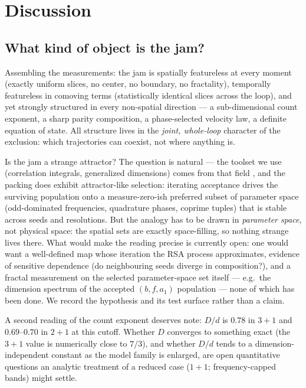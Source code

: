 \documentclass[11pt]{article}
\begin{document}
\section{Discussion}
\label{sec:disc}

\subsection{What kind of object is the jam?}

Assembling the measurements: the jam is spatially featureless at every
moment (exactly uniform slices, no center, no boundary, no fractality),
temporally featureless in comoving terms (statistically identical slices
across the loop), and yet strongly structured in every non-spatial
direction --- a sub-dimensional count exponent, a sharp parity composition,
a phase-selected velocity law, a definite equation of state. All structure
lives in the \emph{joint, whole-loop} character of the exclusion: which
trajectories can coexist, not where anything is.

Is the jam a strange attractor? The question is natural --- the toolset we
use (correlation integrals, generalized dimensions) comes from that field
\cite{gp,hp}, and the packing does exhibit attractor-like selection:
iterating acceptance drives the surviving population onto a measure-zero-ish
preferred subset of parameter space (odd-dominated frequencies, quadrature
phases, coprime tuples) that is stable across seeds and resolutions. But the
analogy has to be drawn in \emph{parameter space}, not physical space: the
spatial sets are exactly space-filling, so nothing strange lives there. What
would make the reading precise is currently open: one would want a
well-defined map whose iteration the RSA process approximates, evidence of
sensitive dependence (do neighbouring seeds diverge in composition?), and a
fractal measurement on the selected parameter-space set itself --- e.g.\ the
dimension spectrum of the accepted $(b, f, a_1)$ population --- none of
which has been done. We record the hypothesis and its test surface rather
than a claim.

A second reading of the count exponent deserves note: $D/d$ is
$0.78$ in $3{+}1$ and $0.69$--$0.70$ in $2{+}1$ at this cutoff. Whether $D$
converges to something exact (the $3{+}1$ value is numerically close to
$7/3$), and whether $D/d$ tends to a dimension-independent constant as the
model family is enlarged, are open quantitative questions an analytic
treatment of a reduced case ($1{+}1$; frequency-capped bands) might settle.
\end{document}
